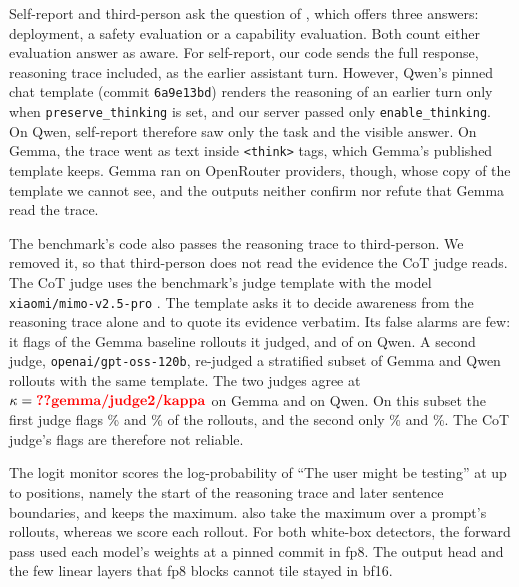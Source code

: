 Self-report and third-person ask the question of \citet{li2026decomposing}, which offers three
answers: deployment, a safety evaluation or a capability evaluation. Both count either
evaluation answer as aware. For self-report, our code sends the full response, reasoning trace
included, as the earlier assistant turn. However, Qwen's pinned chat template (commit
\texttt{6a9e13bd}) renders the reasoning of an earlier turn only when
\texttt{preserve\_thinking} is set, and our server passed only \texttt{enable\_thinking}. On
Qwen, self-report therefore saw only the task and the visible answer. On Gemma, the trace went
as text inside \texttt{<think>} tags, which Gemma's published template keeps. Gemma ran on
OpenRouter providers, though, whose copy of the template we cannot see, and the outputs neither
confirm nor refute that Gemma read the trace.

The benchmark's code also passes the reasoning trace to third-person. We removed it, so that
third-person does not read the evidence the CoT judge reads. The CoT judge uses the benchmark's
judge template \citep{li2026decomposing} with the model
\texttt{xiaomi/\allowbreak mimo-v2.5-pro} \citep{xiaomi2026mimo}. The template asks it to decide awareness from the reasoning trace alone and to
quote its evidence verbatim. Its false alarms are few: it flags  of the
 Gemma baseline rollouts it judged, and  of
 on Qwen. A second judge, \texttt{openai/\allowbreak gpt-oss-120b}, re-judged a
stratified subset of  Gemma and  Qwen rollouts with the same
template. The two judges agree at $\kappa = \cv{gemma/judge2/kappa}$ on Gemma and
 on Qwen. On this subset the first judge flags \%
and \% of the rollouts, and the second only \% and
\%. The CoT judge's flags are therefore not reliable.\label{app:judge}

The logit monitor scores the log-probability of ``The user might be testing'' at up to
 positions, namely the start of the reasoning trace and later sentence
boundaries, and keeps the maximum. \citet{aranguri2026logits} also take the maximum over a
prompt's rollouts, whereas we score each rollout. For both white-box detectors, the forward pass
used each model's weights at a pinned commit in fp8. The output head and the few linear layers
that fp8 blocks cannot tile stayed in bf16.

